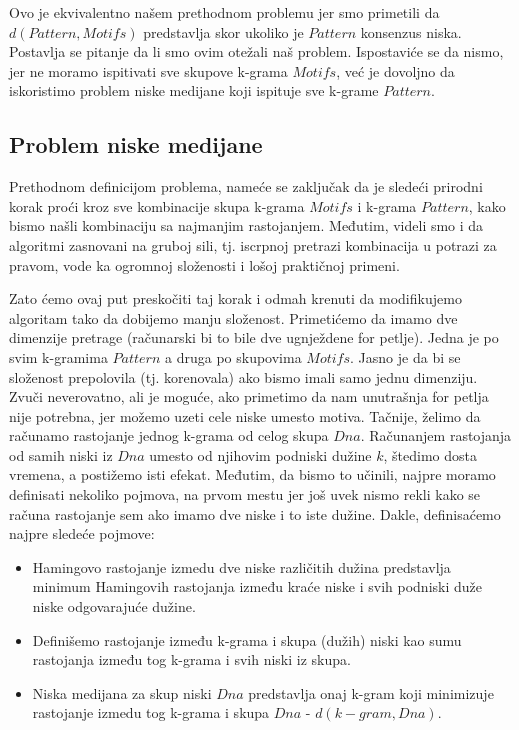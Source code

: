 \noindent Ovo je ekvivalentno našem prethodnom problemu jer smo primetili da $d(Pattern, Motifs)$ predstavlja skor ukoliko je $Pattern$ konsenzus niska. Postavlja se pitanje da li smo ovim otežali naš problem. Ispostaviće se da nismo, jer ne moramo ispitivati sve skupove k-grama $Motifs$, već je dovoljno da iskoristimo problem niske medijane koji ispituje sve k-grame $Pattern$. 

\subsection{Problem niske medijane}
Prethodnom definicijom problema, nameće se zaključak da je sledeći prirodni korak proći kroz sve kombinacije skupa k-grama $Motifs$ i k-grama $Pattern$, kako bismo našli kombinaciju sa najmanjim rastojanjem. Međutim, videli smo i da algoritmi zasnovani na gruboj sili, tj. iscrpnoj pretrazi kombinacija u potrazi za pravom, vode ka ogromnoj složenosti i lošoj praktičnoj primeni. 

Zato ćemo ovaj put preskočiti taj korak i odmah krenuti da modifikujemo algoritam tako da dobijemo manju složenost. Primetićemo da imamo dve dimenzije pretrage (računarski bi to bile dve ugnježdene for petlje). Jedna je po svim k-gramima $Pattern$ a druga po skupovima $Motifs$. Jasno je da bi se složenost prepolovila (tj. korenovala) ako bismo imali samo jednu dimenziju. Zvuči neverovatno, ali je moguće, ako primetimo da nam unutrašnja for petlja nije potrebna, jer možemo uzeti cele niske umesto motiva. Tačnije, želimo da računamo rastojanje jednog k-grama od celog skupa $Dna$. Računanjem rastojanja od samih niski iz $Dna$ umesto od njihovim podniski dužine $k$, štedimo dosta vremena, a postižemo isti efekat. Međutim, da bismo to učinili, najpre moramo definisati nekoliko pojmova, na prvom mestu jer još uvek nismo rekli kako se računa rastojanje sem ako imamo dve niske i to iste dužine. Dakle, definisaćemo najpre sledeće pojmove: 

\begin{itemize}
    \item Hamingovo rastojanje izmedu dve niske različitih dužina predstavlja minimum Hamingovih rastojanja između kraće niske i svih podniski duže niske odgovarajuće dužine.
    \item Definišemo rastojanje između k-grama i skupa (dužih) niski kao sumu rastojanja između tog k-grama i svih niski iz skupa.
    \item Niska medijana za skup niski $Dna$ predstavlja onaj k-gram koji minimizuje rastojanje izmedu tog k-grama i skupa $Dna$ - $d(k-gram, Dna)$.
\end{itemize}

